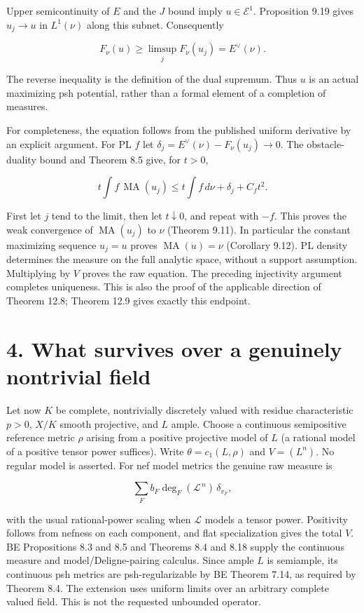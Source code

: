 \documentclass[
  11pt,
]{article}
\begin{document}
Upper semicontinuity of \(E\) and the \(J\) bound imply
\(u\in\mathcal E^1\). Proposition 9.19 gives \(u_j\to u\) in
\(L^1(\nu)\) along this subnet. Consequently

\[F_\nu(u)\geq\limsup_j F_\nu(u_j)=E^\vee(\nu).\]

The reverse inequality is the definition of the dual supremum. Thus
\(u\) is an actual maximizing psh potential, rather than a formal
element of a completion of measures.

For completeness, the equation follows from the published uniform
derivative by an explicit argument. For PL \(f\) let
\(\delta_j=E^\vee(\nu)-F_\nu(u_j)\to0\). The obstacle-duality bound and
Theorem 8.5 give, for \(t>0\),

\[t\int f\,\operatorname{MA}(u_j)\leq t\int f\,d\nu+\delta_j+C_f t^2.\]

First let \(j\) tend to the limit, then let \(t\downarrow0\), and repeat
with \(-f\). This proves the weak convergence of
\(\operatorname{MA}(u_j)\) to \(\nu\) (Theorem 9.11). In particular the
constant maximizing sequence \(u_j=u\) proves
\(\operatorname{MA}(u)=\nu\) (Corollary 9.12). PL density determines the
measure on the full analytic space, without a support assumption.
Multiplying by \(V\) proves the raw equation. The preceding injectivity
argument completes uniqueness. This is also the proof of the applicable
direction of Theorem 12.8; Theorem 12.9 gives exactly this endpoint.

\section{4. What survives over a genuinely nontrivial
field}\label{what-survives-over-a-genuinely-nontrivial-field}

Let now \(K\) be complete, nontrivially discretely valued with residue
characteristic \(p>0\), \(X/K\) smooth projective, and \(L\) ample.
Choose a continuous semipositive reference metric \(\rho\) arising from
a positive projective model of \(L\) (a rational model of a positive
tensor power suffices). Write \(\theta=c_1(L,\rho)\) and \(V=(L^n)\). No
regular model is asserted. For nef model metrics the genuine raw measure
is

\[\sum_F b_F\deg_F(\mathcal L^{\,n})\,\delta_{v_F},\]

with the usual rational-power scaling when \(\mathcal L\) models a
tensor power. Positivity follows from nefness on each component, and
flat specialization gives the total \(V\). BE Propositions 8.3 and 8.5
and Theorems 8.4 and 8.18 supply the continuous measure and
model/Deligne-pairing calculus. Since ample \(L\) is semiample, its
continuous psh metrics are psh-regularizable by BE Theorem 7.14, as
required by Theorem 8.4. The extension uses uniform limits over an
arbitrary complete valued field. This is not the requested unbounded
operator.
\end{document}

